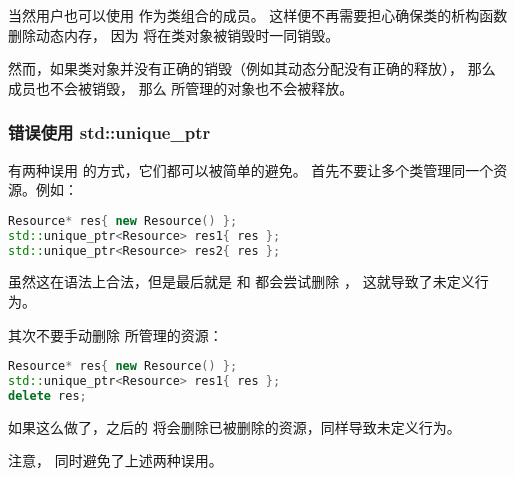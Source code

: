 \documentclass[../../LearnCpp.tex]{subfiles}
\begin{document}
当然用户也可以使用  作为类组合的成员。
这样便不再需要担心确保类的析构函数删除动态内存，
因为  将在类对象被销毁时一同销毁。

然而，如果类对象并没有正确的销毁（例如其动态分配没有正确的释放），
那么  成员也不会被销毁，
那么  所管理的对象也不会被释放。

\subsubsection*{错误使用 std::unique\_ptr}

有两种误用  的方式，它们都可以被简单的避免。
首先不要让多个类管理同一个资源。例如：

\begin{lstlisting}[language=C++]
Resource* res{ new Resource() };
std::unique_ptr<Resource> res1{ res };
std::unique_ptr<Resource> res2{ res };
\end{lstlisting}

虽然这在语法上合法，但是最后就是  和  都会尝试删除 ，
这就导致了未定义行为。

其次不要手动删除  所管理的资源：

\begin{lstlisting}[language=C++]
Resource* res{ new Resource() };
std::unique_ptr<Resource> res1{ res };
delete res;
\end{lstlisting}

如果这么做了，之后的  将会删除已被删除的资源，同样导致未定义行为。

注意， 同时避免了上述两种误用。
\end{document}
